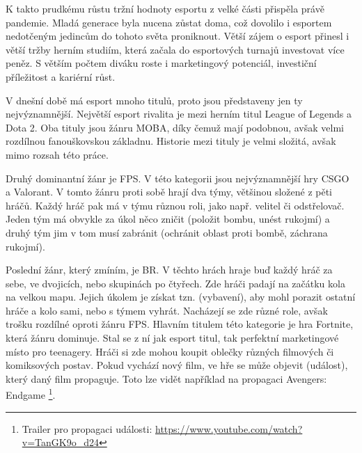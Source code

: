 K takto prudkému růstu tržní hodnoty esportu z velké části přispěla právě pandemie. Mladá generace byla nucena zůstat doma, což dovolilo i esportem nedotčeným jedincům do
tohoto světa proniknout. Větší zájem o esport přinesl i větší tržby herním studiím, která začala do esportových turnajů investovat více
peněz\cite{Professeur2021}\cite{liquipedia2021}. S větším počtem diváku roste i marketingový potenciál, investiční příležitost a kariérní růst.

V dnešní době má esport mnoho titulů, proto jsou představeny jen ty nejvýznamnější. Největší esport rivalita je mezi herním titul League of Legends a Dota 2. Oba tituly jsou žánru
\ac{MOBA}, díky čemuž mají podobnou, avšak velmi rozdílnou fanouškovskou základnu. Historie mezi tituly je velmi složitá, avšak mimo rozsah této práce.

Druhý dominantní žánr je \ac{FPS}. V této kategorii jsou nejvýznamnější hry \ac{CSGO} a Valorant. V tomto žánru proti sobě hrají dva týmy, většinou složené z pěti hráčů.
Každý hráč pak má v týmu různou roli, jako např. velitel či odstřelovač. Jeden tým má obvykle za úkol něco zničit (položit bombu, unést rukojmí) a druhý
tým jim v tom musí zabránit (ochránit oblast proti bombě, záchrana rukojmí).

Poslední žánr, který zmíním, je \ac{BR}. V těchto hrách hraje buď každý hráč za sebe, ve dvojicích, nebo skupinách po čtyřech. Zde hráči padají na začátku kola na velkou mapu.
Jejich úkolem je získat tzn.  (vybavení), aby mohl porazit ostatní hráče a kolo sami, nebo s týmem vyhrát. Nacházejí se zde různé role, avšak trošku rozdílné
oproti žánru \ac{FPS}. Hlavním titulem této kategorie je hra Fortnite, která žánru dominuje. Stal se z ní jak esport titul, tak perfektní marketingové místo pro teenagery.
Hráči si zde mohou koupit oblečky různých filmových či komiksových postav. Pokud vychází nový film, ve hře se může objevit  (událost),
který daný film propaguje. Toto lze vidět například na propagaci Avengers: Endgame
\footnote{Trailer pro propagaci události: \url{https://www.youtube.com/watch?v=TanGK9o_d24}}.

